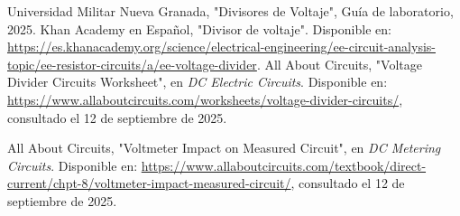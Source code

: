 \documentclass[conference]{IEEEtran}
\begin{document}
\renewcommand{\refname}{Referencias}
\begin{thebibliography}{9}
Universidad Militar Nueva Granada, "Divisores de Voltaje", Gu\'ia de laboratorio, 2025.
Khan Academy en Espa\~nol, "Divisor de voltaje". Disponible en: \url{https://es.khanacademy.org/science/electrical-engineering/ee-circuit-analysis-topic/ee-resistor-circuits/a/ee-voltage-divider}.
All About Circuits, "Voltage Divider Circuits Worksheet", en \emph{DC Electric Circuits}.  Disponible en: \url{https://www.allaboutcircuits.com/worksheets/voltage-divider-circuits/},  consultado el 12 de septiembre de 2025.

All About Circuits, "Voltmeter Impact on Measured Circuit", en \emph{DC Metering Circuits}.  Disponible en: \url{https://www.allaboutcircuits.com/textbook/direct-current/chpt-8/voltmeter-impact-measured-circuit/}, consultado el 12 de septiembre de 2025.
\end{thebibliography}
\end{document}
